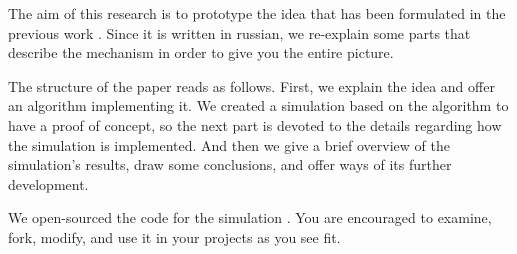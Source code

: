 The aim of this research is to prototype the idea that has been formulated in the previous work
\cite{murashov-2021-ahp}. Since it is written in russian, we re-explain some parts that describe the mechanism in
order to give you the entire picture.

The structure of the paper reads as follows. First, we explain the idea and offer an algorithm implementing it. We
created a simulation based on the algorithm to have a proof of concept, so the next part is devoted to the details
regarding how the simulation is implemented. And then we give a brief overview of the simulation's results, draw some
conclusions, and offer ways of its further development.

We open-sourced the code for the simulation \cite{github}. You are encouraged to examine, fork, modify, and use
it in your projects as you see fit.
